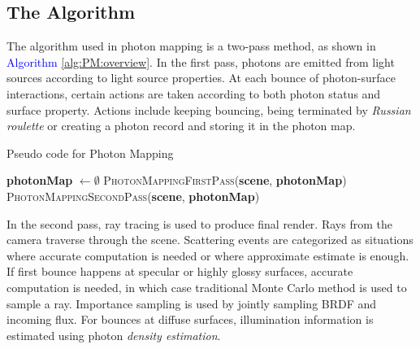 \documentclass[]{book}
\begin{document}
\subsection{The Algorithm}
\label{sec:PM:overview:algorithm}
The algorithm used in photon mapping is a two-pass method, as shown in \textcolor{blue}{Algorithm \ref{alg:PM:overview}}.
In the first pass, photons are emitted from light sources according to light source properties.
At each bounce of photon-surface interactions, certain actions are taken according to both photon status and surface property.
Actions include keeping bouncing, being terminated by \textit{Russian roulette} or creating a photon record and storing it in the photon map.

\begin{algorithm}[t]
	\caption[Photon Mapping]{Pseudo code for Photon Mapping}
	\label{alg:PM:overview}
	\begin{algorithmic}[1]
		\State \textbf{photonMap} $\gets \emptyset$
		\State \textsc{PhotonMappingFirstPass}(\textbf{scene}, \textbf{photonMap})
		\State \textsc{PhotonMappingSecondPass}(\textbf{scene}, \textbf{photonMap})
		\EndProcedure
	\end{algorithmic}
\end{algorithm}

In the second pass, ray tracing is used to produce final render.
Rays from the camera traverse through the scene.
Scattering events are categorized as situations where accurate computation is needed or where approximate estimate is enough.
If first bounce happens at specular or highly glossy surfaces, accurate computation is needed, in which case traditional Monte Carlo method is used to sample a ray.
Importance sampling is used by jointly sampling BRDF and incoming flux.
For bounces at diffuse surfaces, illumination information is estimated using photon \textit{density estimation}.
\end{document}
